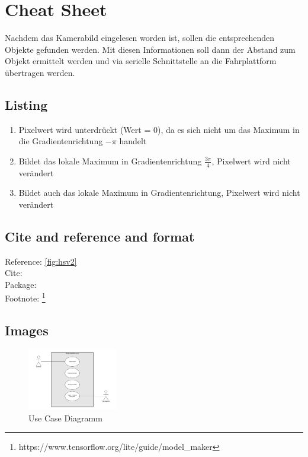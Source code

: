 
\chapter{Cheat Sheet}


%
Nachdem das Kamerabild eingelesen worden ist, sollen die entsprechenden Objekte gefunden werden. Mit diesen Informationen soll dann der Abstand zum Objekt ermittelt werden und via serielle Schnittstelle an die Fahrplattform übertragen werden.




\section{Listing}
\begin{enumerate}[label=(\alph*)]
	\item Pixelwert wird unterdrückt (Wert = 0), da es sich nicht um das Maximum in die Gradientenrichtung $- \pi$ handelt
	\item Bildet das lokale Maximum in Gradientenrichtung $\frac{3 \pi}{4}$, Pixelwert wird nicht verändert
	\item Bildet auch das lokale Maximum in Gradientenrichtung, Pixelwert wird nicht verändert
\end{enumerate}


\section{Cite and reference and format}

Reference: \autoref{fig:hsv2} \\


Cite: \cite{xlinuxai}\\


Package:  \\

Footnote: \footnote{{https://www.tensorflow.org/lite/guide/model\_maker}}

\section{Images}

\begin{figure}[H]
	\centering
	\includegraphics[width=0.35\textwidth]{chapters/cheatsheet/images/UseCaseNeu.png}
	\caption[Use Case Diagramm - Eigene Darstellung]{Use Case Diagramm}
	\label{fig:usecase1}
\end{figure}

